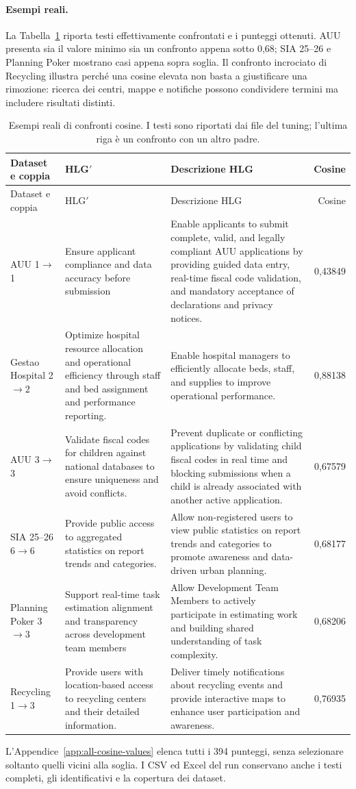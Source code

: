 \paragraph{Esempi reali.}
La Tabella~\ref{tab:cosine-real-examples} riporta testi effettivamente
confrontati e i punteggi ottenuti. AUU presenta sia il valore minimo sia un
confronto appena sotto 0,68; SIA 25--26 e Planning Poker mostrano casi appena
sopra soglia. Il confronto incrociato di Recycling illustra perché una
cosine elevata non basta a giustificare una rimozione: ricerca dei centri,
mappe e notifiche possono condividere termini ma includere risultati distinti.
\begingroup
\small
\setlength{\tabcolsep}{3pt}
\begin{longtable}{@{}p{}p{}p{}r@{}}
\caption{Esempi reali di confronti cosine. I testi sono riportati dai file del tuning; l’ultima riga è un confronto con un altro padre.}\label{tab:cosine-real-examples}\\
\toprule
Dataset e coppia & HLG$\prime$ & Descrizione HLG & Cosine \\
\midrule
\endfirsthead
\toprule
Dataset e coppia & HLG$\prime$ & Descrizione HLG & Cosine \\
\midrule
\endhead
\bottomrule
\endfoot
AUU 1$\rightarrow$1 & Ensure applicant compliance and data accuracy before submission & Enable applicants to submit complete, valid, and legally compliant AUU applications by providing guided data entry, real-time fiscal code validation, and mandatory acceptance of declarations and privacy notices. & 0,43849 \\
Gestao Hospital 2$\rightarrow$2 & Optimize hospital resource allocation and operational efficiency through staff and bed assignment and performance reporting. & Enable hospital managers to efficiently allocate beds, staff, and supplies to improve operational performance. & 0,88138 \\
AUU 3$\rightarrow$3 & Validate fiscal codes for children against national databases to ensure uniqueness and avoid conflicts. & Prevent duplicate or conflicting applications by validating child fiscal codes in real time and blocking submissions when a child is already associated with another active application. & 0,67579 \\
SIA 25--26 6$\rightarrow$6 & Provide public access to aggregated statistics on report trends and categories. & Allow non-registered users to view public statistics on report trends and categories to promote awareness and data-driven urban planning. & 0,68177 \\
Planning Poker 3$\rightarrow$3 & Support real-time task estimation alignment and transparency across development team members & Allow Development Team Members to actively participate in estimating work and building shared understanding of task complexity. & 0,68206 \\
Recycling 1$\rightarrow$3 & Provide users with location-based access to recycling centers and their detailed information. & Deliver timely notifications about recycling events and provide interactive maps to enhance user participation and awareness. & 0,76935 \\
\end{longtable}
\endgroup
L'Appendice~\ref{app:all-cosine-values} elenca tutti i 394 punteggi,
senza selezionare soltanto quelli vicini alla soglia. I CSV ed Excel del run
 conservano anche i testi completi,
gli identificativi e la copertura dei dataset.
